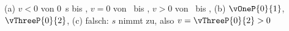 (a) $v<0$ von \SI{0}{\second} bis \tOneO, $v=0$ von \tOneO\ bis \tTwoO, $v>0$ von \tTwoO\ bis \tEndO, (b) $\vOneP{0}{1}$, $\vThreeP{0}{2}$, (c) falsch: $s$ nimmt zu, also $v = \vThreeP{0}{2} > 0$
